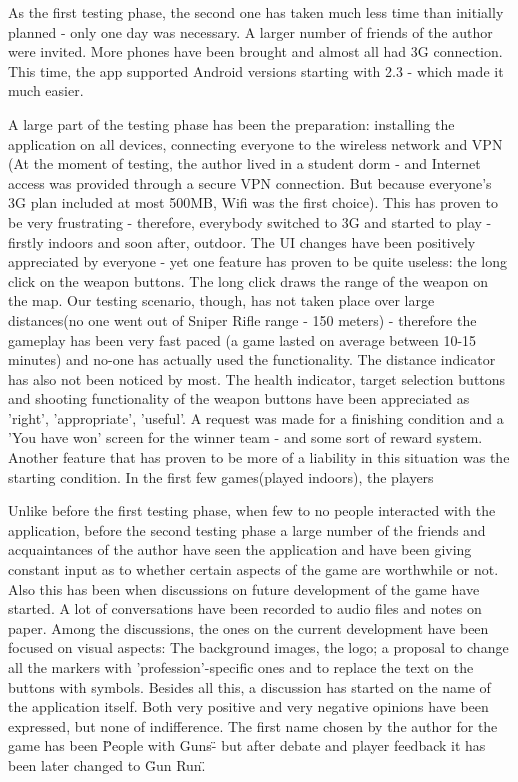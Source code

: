 As the first testing phase, the second one has taken much less time than
initially planned - only one day was necessary. A larger number of friends of
the author were invited. More phones have been brought and almost all had 3G
connection. This time, the app supported Android versions starting with 2.3
- which made it much easier.\newline

A large part of the testing phase has been the preparation: installing the
application on all devices, connecting everyone to the wireless network and VPN
(At the moment of testing, the author lived in a student dorm - and Internet
access was provided through a secure VPN connection. But because everyone's 3G
plan included at most 500MB, Wifi was the first choice). This has proven to be
very frustrating - therefore, everybody switched to 3G and started to play -
firstly indoors and soon after, outdoor. The UI changes have been positively
appreciated by everyone - yet one feature has proven to be quite useless: the
long click on the weapon buttons. The long click draws the range of the weapon
on the map. Our testing scenario, though, has not taken place over large
distances(no one went out of Sniper Rifle range - 150 meters) - therefore the
gameplay has been very fast paced (a game lasted on average between 10-15
minutes) and no-one has actually used the functionality. The distance indicator
has also not been noticed by most. The health indicator, target selection
buttons and shooting functionality of the weapon buttons have been appreciated
as 'right', 'appropriate', 'useful'. A request was made for a finishing
condition and a 'You have won' screen for the winner team - and some sort of
reward system. Another feature that has proven to be more of a liability in this
situation was the starting condition. In the first few games(played indoors),
the players 

Unlike before the first testing phase, when few to no people interacted with
the application, before the second testing phase a large number of the friends
and acquaintances of the author have seen the application and have been giving
constant input as to whether certain aspects of the game are worthwhile or not.
Also this has been when discussions on future development of the game have
started. A lot of conversations have been recorded to audio files and notes on
paper. Among the discussions, the ones on the current development have been
focused on visual aspects: The background images, the logo; a proposal to change
all the markers with 'profession'-specific ones and to replace the text on the
buttons with symbols. Besides all this, a discussion has started on the name of
the application itself. Both very positive and very negative opinions have been
expressed, but none of indifference. The first name chosen by the author for the
game has been \"People with Guns\" - but after debate and player
feedback it has been later changed to \"Gun Run\".\newline

